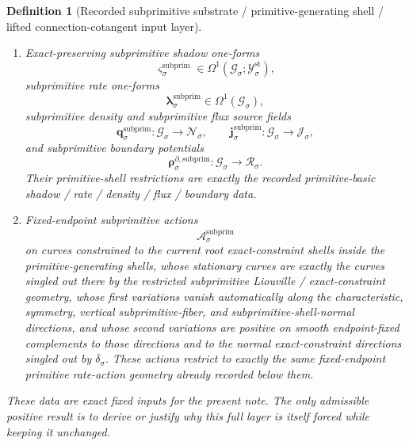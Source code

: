 \documentclass[11pt]{article}
\newcommand{\StatTagClass}[1]{\mathcal Y_{#1}^{\mathrm{st}}}
\newcommand{\DensityClass}[1]{\mathscr N_{#1}}
\newcommand{\FluxClass}[1]{\mathscr J_{#1}}
\newcommand{\PhaseReadClass}[1]{\mathscr R_{#1}}
\newcommand{\ConstraintGap}[1]{\delta_{#1}}
\newcommand{\SubprimSpace}[1]{\mathcal G_{#1}}
\newcommand{\SubprimShadowForm}[1]{\boldsymbol{\varsigma}_{#1}^{\mathrm{subprim}}}
\newcommand{\SubprimRateForm}[1]{\boldsymbol{\lambda}_{#1}^{\mathrm{subprim}}}
\newcommand{\SubprimDensitySource}[1]{\boldsymbol{q}_{#1}^{\mathrm{subprim}}}
\newcommand{\SubprimFluxSource}[1]{\boldsymbol{j}_{#1}^{\mathrm{subprim}}}
\newcommand{\SubprimBoundarySource}[1]{\boldsymbol{\rho}_{#1}^{\partial,\mathrm{subprim}}}
\newcommand{\SubprimAction}[1]{\mathscr A_{#1}^{\mathrm{subprim}}}
\newtheorem{definition}{Definition}
\begin{document}
\begin{definition}[Recorded subprimitive substrate / primitive-generating shell / lifted connection-cotangent input layer]
\begin{enumerate}
    \item Exact-preserving subprimitive shadow one-forms
    \[
    \SubprimShadowForm{\sigma}\in\Omega^1(\SubprimSpace{\sigma};\StatTagClass{\sigma}),
    \]
    subprimitive rate one-forms
    \[
    \SubprimRateForm{\sigma}\in\Omega^1(\SubprimSpace{\sigma}),
    \]
    subprimitive density and subprimitive flux source fields
    \[
    \SubprimDensitySource{\sigma}:\SubprimSpace{\sigma}\to\DensityClass{\sigma},
    \qquad
    \SubprimFluxSource{\sigma}:\SubprimSpace{\sigma}\to\FluxClass{\sigma},
    \]
    and subprimitive boundary potentials
    \[
    \SubprimBoundarySource{\sigma}:\SubprimSpace{\sigma}\to\PhaseReadClass{\sigma}.
    \]
    Their primitive-shell restrictions are exactly the recorded primitive-basic shadow / rate / density / flux / boundary data.
    \item Fixed-endpoint subprimitive actions
    \[
    \SubprimAction{\sigma}
    \]
    on curves constrained to the current root exact-constraint shells inside the primitive-generating shells, whose stationary curves are exactly the curves singled out there by the restricted subprimitive Liouville / exact-constraint geometry, whose first variations vanish automatically along the characteristic, symmetry, vertical subprimitive-fiber, and subprimitive-shell-normal directions, and whose second variations are positive on smooth endpoint-fixed complements to those directions and to the normal exact-constraint directions singled out by \(\ConstraintGap{\sigma}\). These actions restrict to exactly the same fixed-endpoint primitive rate-action geometry already recorded below them.
\end{enumerate}
These data are exact fixed inputs for the present note. The only admissible positive result is to derive or justify why this full layer is itself forced while keeping it unchanged.
\end{definition}
\end{document}

